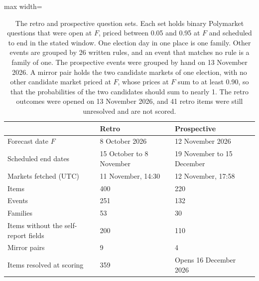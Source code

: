 \begin{table}[t]
\centering
\small
\setlength{\tabcolsep}{4pt}
\begin{adjustbox}{max width=\linewidth}
\begin{tabular}{lll}
\toprule
& Retro & Prospective \\
\midrule
Forecast date $F$ & 8 October 2026 & 12 November 2026 \\
Scheduled end dates & 15 October to 8 November & 19 November to 15 December \\
Markets fetched (UTC) & 11 November, 14:30 & 12 November, 17:58 \\
Items & 400 & 220 \\
Events & 251 & 132 \\
Families & 53 & 30 \\
Items without the self-report fields & 200 & 110 \\
Mirror pairs & 9 & 4 \\
Items resolved at scoring & 359 & Opens 16 December 2026 \\
\bottomrule
\end{tabular}
\end{adjustbox}
\caption{The retro and prospective question sets. Each set holds binary Polymarket questions that were open at $F$, priced between 0.05 and 0.95 at $F$ and scheduled to end in the stated window. One election day in one place is one family. Other events are grouped by 26 written rules, and an event that matches no rule is a family of one. The prospective events were grouped by hand on 13 November 2026. A mirror pair holds the two candidate markets of one election, with no other candidate market priced at $F$, whose prices at $F$ sum to at least 0.90, so that the probabilities of the two candidates should sum to nearly 1. The retro outcomes were opened on 13 November 2026, and 41 retro items were still unresolved and are not scored.}
\label{tab:sets}
\end{table}
